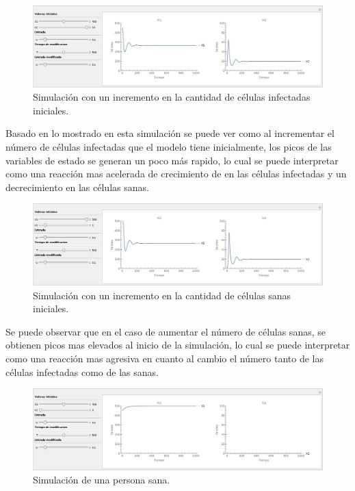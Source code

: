 \documentclass{article}
\begin{document}
\begin{figure}[H]
    \includegraphics[width=\textwidth]{Images/Vih-more-infected.jpeg}
    \caption{Simulación con un incremento en la cantidad de células infectadas iniciales.}
\end{figure}

Basado en lo mostrado en esta simulación se puede ver como al incrementar el
número de células infectadas que el modelo tiene inicialmente, los picos de
las variables de estado se generan un poco más rapido, lo cual se puede interpretar como una
reacción mas acelerada de crecimiento de en las células infectadas y un
decrecimiento en las células sanas.

\begin{figure}[H]
    \includegraphics[width=\textwidth]{Images/Vih-more-healthy.jpeg}
    \caption{Simulación con un incremento en la cantidad de células sanas iniciales.}
\end{figure}

Se puede observar que en el caso de aumentar el número de células sanas, se obtienen
picos mas elevados al inicio de la simulación, lo cual se puede interpretar como
una reacción mas agresiva en cuanto al cambio el número tanto de las células infectadas
como de las sanas.

\begin{figure}[H]
    \includegraphics[width=\textwidth]{Images/Vih-healthy.jpeg}
    \caption{Simulación de una persona sana.}
\end{figure}
\end{document}
